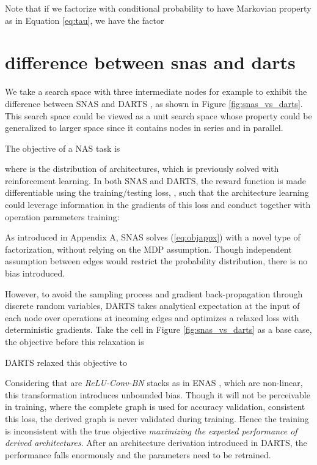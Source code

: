 \documentclass{article} \usepackage{iclr2019_conference,times}
\newcommand{\zh}{\color{black}}
\begin{document}
Note that if we factorize  with conditional probability to have Markovian property as in Equation \ref{eq:tau}, we have the factor 


\section{difference between snas and darts}
We take a search space with three intermediate nodes for example to exhibit the difference between SNAS and DARTS \citep{liu2018darts}, as shown in Figure \ref{fig:snas_vs_darts}. This search space could be viewed as a unit search space whose property could be generalized to larger space since it contains nodes in series and in parallel. 

The objective of a NAS task is 

where  is the distribution of {\zh architectures}, which is previously solved with reinforcement learning. In both SNAS and DARTS, the reward function is made differentiable using the training/testing loss, , such that the {\zh architecture} learning could leverage information in the gradients of this loss and conduct together with operation parameters training:

As introduced in Appendix A, SNAS solves (\ref{eq:objappx}) with a novel type of factorization, without relying on the MDP assumption. Though independent assumption between edges would restrict the probability distribution, there is no bias introduced. 

However, to avoid the sampling process and gradient back-propagation through discrete random variables, DARTS takes analytical expectation at the input of each node over operations at incoming edges and optimizes a relaxed loss with deterministic gradients. Take the cell in Figure \ref{fig:snas_vs_darts} as a base case, the objective before this relaxation is

DARTS relaxed this objective to 

{\zh Considering} that  are \textit{ReLU-Conv-BN} stacks as in ENAS \citep{pham2018efficient}, which are non-linear, this transformation introduces unbounded bias. Though it will not be perceivable in training, where the complete graph is used for accuracy validation, consistent this loss, the derived graph is never validated during training. Hence the training is inconsistent with the true objective \textit{maximizing the expected {\zh performance} of derived {\zh architectures}}. After an {\zh architecture} derivation introduced in DARTS, the performance falls enormously and the parameters need to be retrained.
\end{document}
